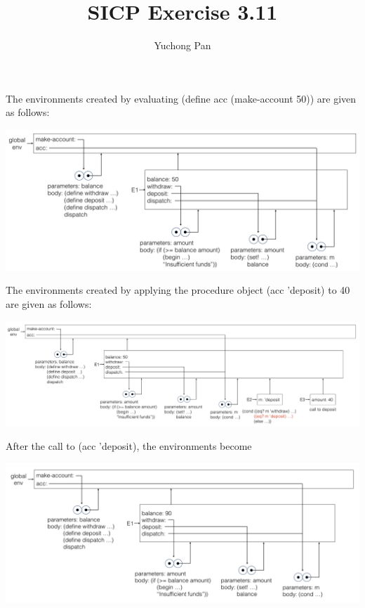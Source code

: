 \documentclass[11pt, oneside]{article}
\title{SICP Exercise 3.11}
\author{Yuchong Pan}
\begin{document}
\maketitle

The environments created by evaluating (define acc (make-account 50)) are given as follows:

\begin{center}
    \includegraphics[width=15cm]{ex-3.11-1.png}
\end{center}

The environments created by applying the procedure object (acc 'deposit) to 40 are given as follows:

\begin{center}
    \includegraphics[width=15cm]{ex-3.11-2.png}
\end{center}

After the call to (acc 'deposit), the environments become

\begin{center}
    \includegraphics[width=15cm]{ex-3.11-3.png}
\end{center}
\end{document}
